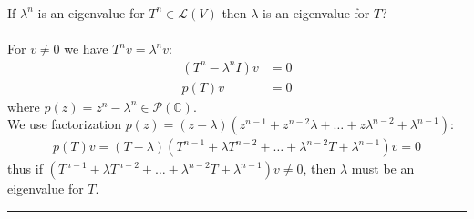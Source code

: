 \documentclass[12pt, letterpaper]{scrartcl}
\newcommand{\C}{\mathbb{C}}
\begin{document}
\subsubsection*{}
{\color{blue}If $\lambda^n$ is an eigenvalue for $T^n\in\mathcal{L}(V)$ then $\lambda$ is an eigenvalue for $T$?}
\\\\
For $v\neq0$ we have $T^nv=\lambda^n v$:
\begin{align*}
    (T^n-\lambda^nI)v&=0\\
    p(T)v&=0
\end{align*}
 where $p(z)=z^n-\lambda^n \in \mathcal{P}(\C)$.\\
 We use factorization $p(z)=(z-\lambda)(z^{n-1}+z^{n-2}\lambda+\dots+z\lambda^{n-2}+\lambda^{n-1})$:
\begin{align*}
    p(T)v=(T-\lambda)(T^{n-1}+\lambda T^{n-2}+\dots+\lambda^{n-2}T+\lambda^{n-1})v=0
\end{align*}
thus if $(T^{n-1}+\lambda T^{n-2}+\dots+\lambda^{n-2}T+\lambda^{n-1})v\neq0$, then $\lambda$ must be an eigenvalue for $T$.
\vskip1mm\hrule
\end{document}
